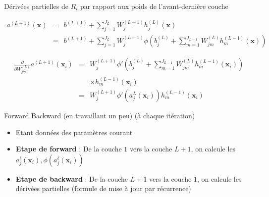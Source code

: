 \documentclass[ignorenonframetext,]{beamer}
\providecommand{\tightlist}{%
  \setlength{\itemsep}{0pt}\setlength{\parskip}{0pt}}
\begin{document}
\begin{frame}{Dérivées partielles de \(R_i\) par rapport aux poids de
l'avant-dernière couche}

\begin{eqnarray*} 
a^{(L+1)}(\mathbf{x}) &=&  b^{(L+1)} + \sum_{j=1}^{J_L} W^{(L+1)}_j h_j^{(L)}(\mathbf{x}) \\
&=&  b^{(L+1)} + \sum_{j=1}^{J_L}  W^{(L+1)}_j \phi \left(b_j^{(L)} + \sum_{m=1}^{J_{L-1}} W^{(L)}_{jm} h_m^{(L-1)}(\mathbf{x})\right)
\end{eqnarray*}

\begin{eqnarray*}
\frac{\partial}{\partial W^{(L)}_{jm}}  a^{(L+1)}(\mathbf{x}_i)  &=&   W^{(L+1)}_j \phi' \left(b_j^{(L)} + \sum_{m=1}^{J_{L-1}} W^{(L)}_{jm} h_m^{(L-1)}(\mathbf{x}_i)\right) \\
&& \times h_m^{(L-1)}(\mathbf{x}_i)   \\
&=& W^{(L+1)}_j \phi'(a_j^{L}(\mathbf{x}_i)) h_m^{(L-1)}(\mathbf{x}_i)
\end{eqnarray*}

\end{frame}

\begin{frame}{Forward Backward (en travaillant un peu) (à chaque
itération)}

\begin{itemize}
\tightlist
\item
  Etant données des paramètres courant
\item
  \textbf{Etape de forward} : De la couche \(1\) vers la couche \(L+1\),
  on calcule les
  \(a_j^{\ell}(\mathbf{x}_i),\phi(a_j^{\ell}(\mathbf{x}_i))\)
\item
  \textbf{Etape de backward} : De la couche \(L+1\) vers la couche
  \(1\), on calcule les dérivées partielles (formule de mise à jour par
  récurrence)
\end{itemize}

\end{frame}
\end{document}
